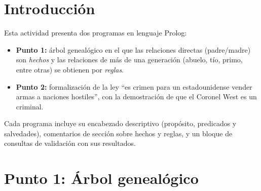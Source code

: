 \documentclass[12pt]{report}
\begin{document}

\tableofcontents
\newpage


\chapter{Introducción}

Esta actividad presenta dos programas en lenguaje Prolog:

\begin{itemize}
    \item \textbf{Punto 1:} árbol genealógico en el que las relaciones
          directas (padre/madre) son \emph{hechos} y las relaciones de más
          de una generación (abuelo, tío, primo, entre otras) se obtienen
          por \emph{reglas}.
    \item \textbf{Punto 2:} formalización de la ley ``es crimen para un
          estadounidense vender armas a naciones hostiles'', con la
          demostración de que el Coronel West es un criminal.
\end{itemize}

Cada programa incluye su encabezado descriptivo (propósito, predicados y
salvedades), comentarios de sección sobre hechos y reglas, y un bloque de
consultas de validación con sus resultados.

\newpage


\chapter{Punto 1: Árbol genealógico}
\end{document}
